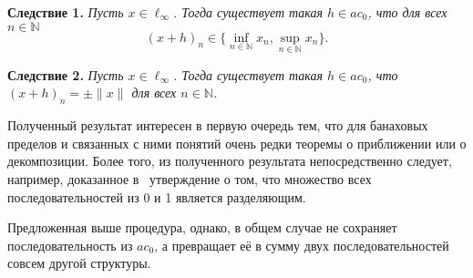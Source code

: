 \documentclass[a4paper,14pt]{article}
\begin{document}
\medskip

\textbf{Следствие 1.} {\sl
	Пусть $x\in\ell_\infty$.
	Тогда существует такая $h\in ac_0$, что для всех $n\in\mathbb N$
	\begin{equation*}
		(x+h)_n \in \{\inf_{n\in\mathbb N} x_n,\sup_{n\in\mathbb N} x_n\}
		.
	\end{equation*}
}

\medskip

\textbf{Следствие 2.} {\sl
	Пусть $x\in\ell_\infty$.
	Тогда существует такая $h\in ac_0$, что $(x+h)_n =\pm \|x\|$ для всех $n\in\mathbb N$.
}

\medskip

Полученный результат интересен в первую очередь тем, что для банаховых пределов и связанных с ними понятий
очень редки теоремы о приближении или о декомпозиции.
Более того, из полученного результата непосредственно следует, например,
доказанное в~\cite{semenov2010characteristic} утверждение о том, что множество всех последовательностей из 0 и 1 является разделяющим.

Предложенная выше процедура, однако, в общем случае не сохраняет последовательность из $ac_0$,
а превращает её в сумму двух последовательностей совсем другой структуры.



\setcounter{equation}{0}
\setcounter{figure}{0}
\end{document}
